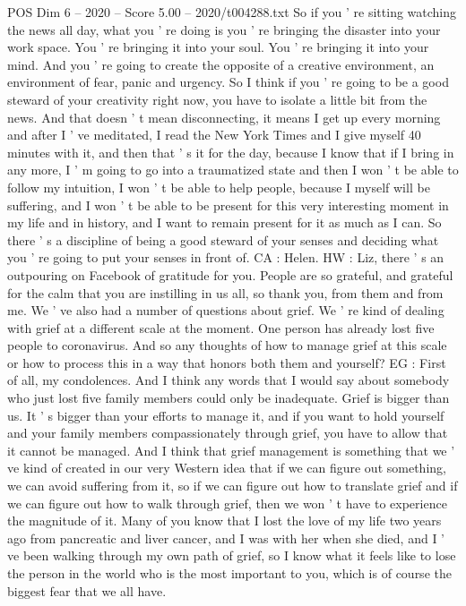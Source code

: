\begin{textsample}{POS Dim 6 – 2020 – Score 5.00 – 2020/t004288.txt}
So if you ' re sitting watching the news all day, what you ' re doing is you ' re bringing the disaster into your work space.
You ' re bringing it into your soul.
You ' re bringing it into your mind.
And you ' re going to create the opposite of a creative environment, an environment of fear, panic and urgency.
So I think if you ' re going to be a good steward of your creativity right now, you have to isolate a little bit from the news.
And that doesn ' t mean disconnecting, it means I get up every morning and after I ' ve meditated, I read the New York Times and I give myself 40 minutes with it, and then that ' s it for the day, because I know that if I bring in any more, I ' m going to go into a traumatized state and then I won ' t be able to follow my intuition, I won ' t be able to help people, because I myself will be suffering, and I won ' t be able to be present for this very interesting moment in my life and in history, and I want to remain present for it as much as I can.
So there ' s a discipline of being a good steward of your senses and deciding what you ' re going to put your senses in front of.
CA : Helen.
HW : Liz, there ' s an outpouring on Facebook of gratitude for you.
People are so grateful, and grateful for the calm that you are instilling in us all, so thank you, from them and from me.
We ' ve also had a number of questions about grief.
We ' re kind of dealing with grief at a different scale at the moment.
One person has already lost five people to coronavirus.
And so any thoughts of how to manage grief at this scale or how to process this in a way that honors both them and yourself?
EG : First of all, my condolences.
And I think any words that I would say about somebody who just lost five family members could only be inadequate.
Grief is bigger than us.
It ' s bigger than your efforts to manage it, and if you want to hold yourself and your family members compassionately through grief, you have to allow that it cannot be managed.
And I think that grief management is something that we ' ve kind of created in our very Western idea that if we can figure out something, we can avoid suffering from it, so if we can figure out how to translate grief and if we can figure out how to walk through grief, then we won ' t have to experience the magnitude of it.
Many of you know that I lost the love of my life two years ago from pancreatic and liver cancer, and I was with her when she died, and I ' ve been walking through my own path of grief, so I know what it feels like to lose the person in the world who is the most important to you, which is of course the biggest fear that we all have.

\end{textsample}
